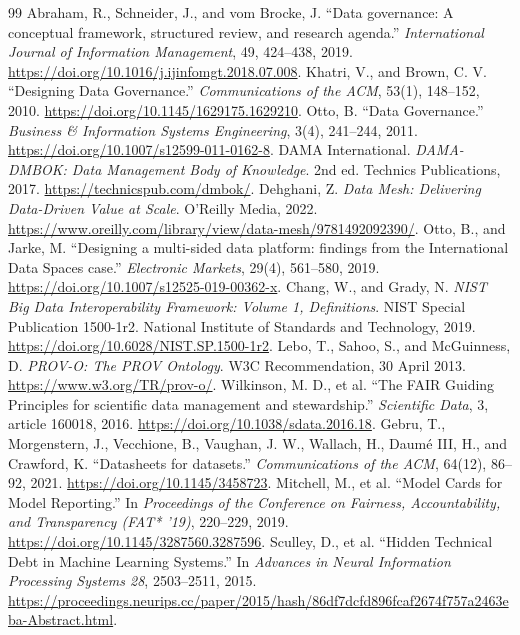 \documentclass[a4paper,12pt,twoside]{report}
\theoremstyle{definition}
\begin{document}
\begin{thebibliography}{99}
 Abraham, R., Schneider, J., and vom Brocke, J. ``Data governance: A conceptual framework, structured review, and research agenda.'' \emph{International Journal of Information Management}, 49, 424--438, 2019. \url{https://doi.org/10.1016/j.ijinfomgt.2018.07.008}.
 Khatri, V., and Brown, C. V. ``Designing Data Governance.'' \emph{Communications of the ACM}, 53(1), 148--152, 2010. \url{https://doi.org/10.1145/1629175.1629210}.
 Otto, B. ``Data Governance.'' \emph{Business \& Information Systems Engineering}, 3(4), 241--244, 2011. \url{https://doi.org/10.1007/s12599-011-0162-8}.
 DAMA International. \emph{DAMA-DMBOK: Data Management Body of Knowledge}. 2nd ed. Technics Publications, 2017. \url{https://technicspub.com/dmbok/}.
 Dehghani, Z. \emph{Data Mesh: Delivering Data-Driven Value at Scale}. O'Reilly Media, 2022. \url{https://www.oreilly.com/library/view/data-mesh/9781492092390/}.
 Otto, B., and Jarke, M. ``Designing a multi-sided data platform: findings from the International Data Spaces case.'' \emph{Electronic Markets}, 29(4), 561--580, 2019. \url{https://doi.org/10.1007/s12525-019-00362-x}.
 Chang, W., and Grady, N. \emph{NIST Big Data Interoperability Framework: Volume 1, Definitions}. NIST Special Publication 1500-1r2. National Institute of Standards and Technology, 2019. \url{https://doi.org/10.6028/NIST.SP.1500-1r2}.
 Lebo, T., Sahoo, S., and McGuinness, D. \emph{PROV-O: The PROV Ontology}. W3C Recommendation, 30 April 2013. \url{https://www.w3.org/TR/prov-o/}.
 Wilkinson, M. D., et al. ``The FAIR Guiding Principles for scientific data management and stewardship.'' \emph{Scientific Data}, 3, article 160018, 2016. \url{https://doi.org/10.1038/sdata.2016.18}.
 Gebru, T., Morgenstern, J., Vecchione, B., Vaughan, J. W., Wallach, H., Daum\'e III, H., and Crawford, K. ``Datasheets for datasets.'' \emph{Communications of the ACM}, 64(12), 86--92, 2021. \url{https://doi.org/10.1145/3458723}.
 Mitchell, M., et al. ``Model Cards for Model Reporting.'' In \emph{Proceedings of the Conference on Fairness, Accountability, and Transparency (FAT* '19)}, 220--229, 2019. \url{https://doi.org/10.1145/3287560.3287596}.
 Sculley, D., et al. ``Hidden Technical Debt in Machine Learning Systems.'' In \emph{Advances in Neural Information Processing Systems 28}, 2503--2511, 2015. \url{https://proceedings.neurips.cc/paper/2015/hash/86df7dcfd896fcaf2674f757a2463eba-Abstract.html}.

\end{thebibliography}
\end{document}
